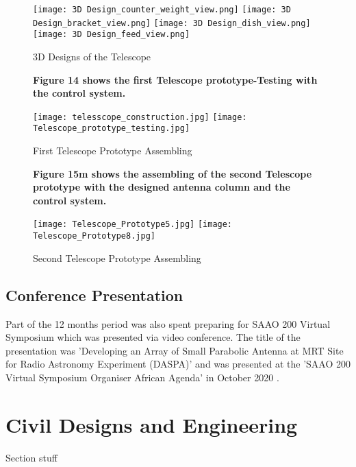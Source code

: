 {\begin{figure}[htp]
    \centering
 \texttt{[image: 3D Design\_counter\_weight\_view.png]}
  \texttt{[image: 3D Design\_bracket\_view.png]}
   \texttt{[image: 3D Design\_dish\_view.png]}
 \texttt{[image: 3D Design\_feed\_view.png]}
 \caption{3D Designs of the Telescope }
    \label{fig:galaxy}
\end{figure}

\begin{figure}[htp]
    \centering
    \textbf{Figure 14 shows the first Telescope prototype-Testing with the control system.}
    
    \vspace{1cm}
    
 \texttt{[image: telesscope\_construction.jpg]}
\texttt{[image: Telescope\_prototype\_testing.jpg]}
\caption{First Telescope Prototype Assembling}
  \label{fig:galaxy}
\vspace{1cm}

\textbf{Figure 15m shows the assembling of the second Telescope prototype with the designed antenna column and the control system.} 
\vspace{0.5cm} 
    
\texttt{[image: Telescope\_Prototype5.jpg]}
\texttt{[image: Telescope\_Prototype8.jpg]}
\caption{Second Telescope Prototype Assembling}
    \label{fig:galaxy}
\end{figure}


\subsection{Conference Presentation}
Part of the 12 months period was also spent preparing for SAAO 200 Virtual Symposium which was presented via video conference. The title of the presentation was ’Developing an Array of Small Parabolic Antenna at MRT Site for Radio Astronomy Experiment (DASPA)’ and was presented at the ’SAAO 200 Virtual Symposium Organiser African Agenda’ in October 2020 \cite{Forson2020SAAO200}.





\section{Civil Designs 
and Engineering}
Section stuff

}
